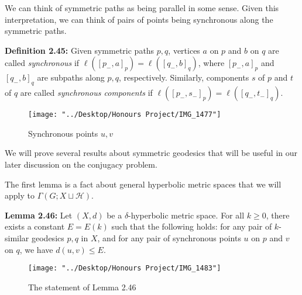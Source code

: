 \documentclass[12pt]{article}
\newcommand{\vs}{\vskip10pt}
\begin{document}
	\vs 
	
	We can think of symmetric paths as being parallel in some sense. Given this interpretation, we can think of pairs of points being synchronous along the symmetric paths. 
	
	\vs 
	
	\textbf{Definition 2.45: } Given symmetric paths $p,q$, vertices $a$ on $p$ and $b$ on $q$ are called \textit{synchronous} if $\ell([p_{-}, a]_p) = \ell([q_{-}, b]_q)$, where $[p_{-}, a]_p$ and $[q_{-}, b]_q$ are subpaths along $p,q$, respectively. Similarly, components $s$ of $p$ and $t$ of $q$ are called \textit{synchronous components} if $\ell([p_{-}, s_{-}]_p) = \ell([q_{-}, t_{-}]_q)$. 
	
\begin{figure} [H]
	\centering
	\texttt{[image: "../Desktop/Honours Project/IMG\_1477"]}
	\caption{Synchronous points $u,v$}
	\label{fig:img1477}
\end{figure}
	
	\vs 
	
	We will prove several results about symmetric geodesics that will be useful in our later discussion on the conjugacy problem. 
	
	\vs 
	
	The first lemma is a fact about general hyperbolic metric spaces that we will apply to $\Gamma(G; X \sqcup \mathcal{H})$. 
	
	\vs 
	
	\textbf{Lemma 2.46: } Let $(X,d)$ be a $\delta$-hyperbolic metric space. For all $k \geq 0$, there exists a constant $E = E(k)$ such that the following holds: for any pair of $k$-similar geodesics $p,q$ in $X$, and for any pair of synchronous points $u$ on $p$ and $v$ on $q$, we have $d(u,v) \leq E$. 
	
\begin{figure} [H]
	\centering
	\texttt{[image: "../Desktop/Honours Project/IMG\_1483"]}
	\caption{The statement of Lemma 2.46}
	\label{fig:img1483}
\end{figure}
	
\end{document}
